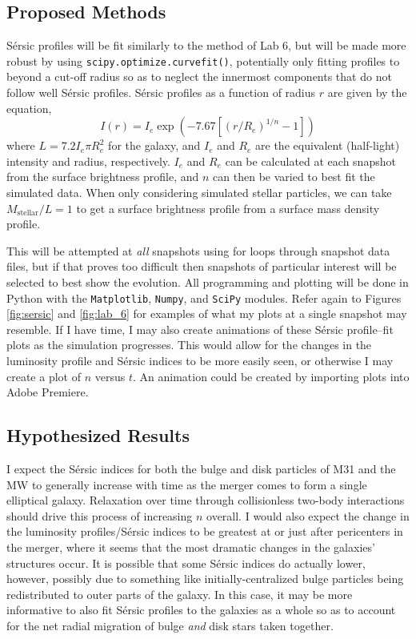 \documentclass[twocolumn]{aastex631}
\begin{document}
\subsection{Proposed Methods}
S\'{e}rsic profiles will be fit similarly to the method of Lab 6, but will be made more robust by using \texttt{scipy.optimize.curvefit()}, potentially only fitting profiles to beyond a cut-off radius so as to neglect the innermost components that do not follow well S\'{e}rsic profiles. S\'ersic profiles as a function of radius $r$ are given by the equation,
\begin{equation}
    I(r) = I_e \exp{(-7.67[(r/R_e)^{1/n} - 1])}
\end{equation}
where $L = 7.2 I_e \pi R_e^2$ for the galaxy, and $I_e$ and $R_e$ are the equivalent (half-light) intensity and radius, respectively. $I_e$ and $R_e$ can be calculated at each snapshot from the surface brightness profile, and $n$ can then be varied to best fit the simulated data. When only considering simulated stellar particles, we can take $M_\mathrm{stellar}/L = 1$ to get a surface brightness profile from a surface mass density profile.

This will be attempted at \emph{all} snapshots using for loops through snapshot data files, but if that proves too difficult then snapshots of particular interest will be selected to best show the evolution. All programming and plotting will be done in Python with the \texttt{Matplotlib}, \texttt{Numpy}, and \texttt{SciPy} modules. Refer again to Figures \ref{fig:sersic} and \ref{fig:lab_6} for examples of what my plots at a single snapshot may resemble. If I have time, I may also create animations of these S\'{e}rsic profile--fit plots as the simulation progresses. This would allow for the changes in the luminosity profile and S\'{e}rsic indices to be more easily seen, or otherwise I may create a plot of $n$ versus $t$. An animation could be created by importing plots into Adobe Premiere.

\subsection{Hypothesized Results}
I expect the S\'{e}rsic indices for both the bulge and disk particles of M31 and the MW to generally increase with time as the merger comes to form a single elliptical galaxy. Relaxation over time through collisionless two-body interactions should drive this process of increasing $n$ overall. I would also expect the change in the luminosity profiles/S\'{e}rsic indices to be greatest at or just after pericenters in the merger, where it seems that the most dramatic changes in the galaxies' structures occur. It is possible that some S\'{e}rsic indices do actually lower, however, possibly due to something like initially-centralized bulge particles being redistributed to outer parts of the galaxy. In this case, it may be more informative to also fit S\'{e}rsic profiles to the galaxies as a whole so as to account for the net radial migration of bulge \emph{and} disk stars taken together.
\end{document}
